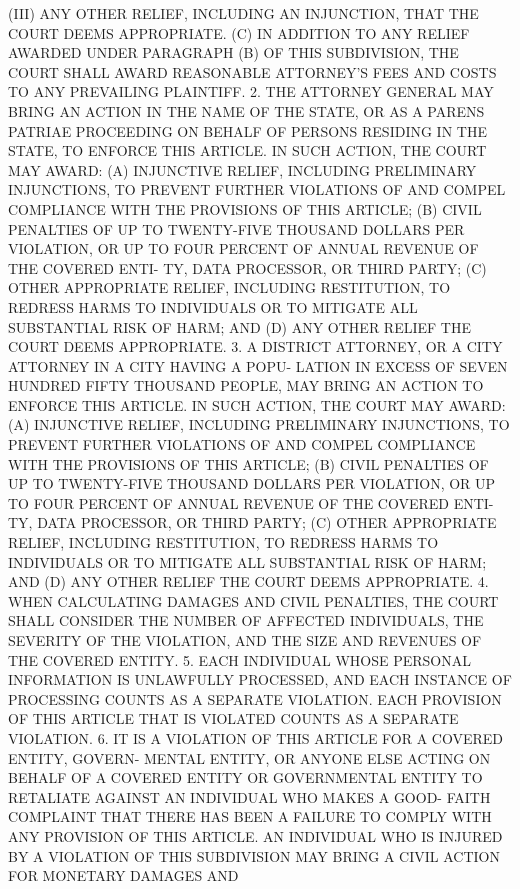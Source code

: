    (III) ANY OTHER RELIEF, INCLUDING AN INJUNCTION, THAT THE COURT  DEEMS
 APPROPRIATE.
   (C)  IN  ADDITION  TO  ANY  RELIEF AWARDED UNDER PARAGRAPH (B) OF THIS
 SUBDIVISION, THE COURT SHALL AWARD REASONABLE ATTORNEY'S FEES AND  COSTS
 TO ANY PREVAILING PLAINTIFF.
   2.  THE ATTORNEY GENERAL MAY BRING AN ACTION IN THE NAME OF THE STATE,
 OR AS A PARENS PATRIAE PROCEEDING ON BEHALF OF PERSONS RESIDING  IN  THE
 STATE, TO ENFORCE THIS ARTICLE. IN SUCH ACTION, THE COURT MAY AWARD:
   (A)  INJUNCTIVE  RELIEF, INCLUDING PRELIMINARY INJUNCTIONS, TO PREVENT
 FURTHER VIOLATIONS OF AND COMPEL COMPLIANCE WITH THE PROVISIONS OF  THIS
 ARTICLE;
   (B)  CIVIL  PENALTIES  OF  UP  TO  TWENTY-FIVE  THOUSAND  DOLLARS  PER
 VIOLATION, OR UP TO FOUR PERCENT OF ANNUAL REVENUE OF THE COVERED  ENTI-
 TY, DATA PROCESSOR, OR THIRD PARTY;
   (C)  OTHER APPROPRIATE RELIEF, INCLUDING RESTITUTION, TO REDRESS HARMS
 TO INDIVIDUALS OR TO MITIGATE ALL SUBSTANTIAL RISK OF HARM; AND
   (D) ANY OTHER RELIEF THE COURT DEEMS APPROPRIATE.
   3. A DISTRICT ATTORNEY, OR A CITY ATTORNEY IN A CITY  HAVING  A  POPU-
 LATION  IN  EXCESS  OF SEVEN HUNDRED FIFTY THOUSAND PEOPLE, MAY BRING AN
 ACTION TO ENFORCE THIS ARTICLE. IN SUCH ACTION, THE COURT MAY AWARD:
   (A) INJUNCTIVE RELIEF, INCLUDING PRELIMINARY INJUNCTIONS,  TO  PREVENT
 FURTHER  VIOLATIONS OF AND COMPEL COMPLIANCE WITH THE PROVISIONS OF THIS
 ARTICLE;
   (B)  CIVIL  PENALTIES  OF  UP  TO  TWENTY-FIVE  THOUSAND  DOLLARS  PER
 VIOLATION,  OR UP TO FOUR PERCENT OF ANNUAL REVENUE OF THE COVERED ENTI-
 TY, DATA PROCESSOR, OR THIRD PARTY;
   (C) OTHER APPROPRIATE RELIEF, INCLUDING RESTITUTION, TO REDRESS  HARMS
 TO INDIVIDUALS OR TO MITIGATE ALL SUBSTANTIAL RISK OF HARM; AND
   (D) ANY OTHER RELIEF THE COURT DEEMS APPROPRIATE.
   4.  WHEN  CALCULATING  DAMAGES  AND  CIVIL  PENALTIES, THE COURT SHALL
 CONSIDER THE  NUMBER  OF  AFFECTED  INDIVIDUALS,  THE  SEVERITY  OF  THE
 VIOLATION, AND THE SIZE AND REVENUES OF THE COVERED ENTITY.
   5. EACH INDIVIDUAL WHOSE PERSONAL INFORMATION IS UNLAWFULLY PROCESSED,
 AND  EACH  INSTANCE  OF  PROCESSING COUNTS AS A SEPARATE VIOLATION. EACH
 PROVISION OF  THIS  ARTICLE  THAT  IS  VIOLATED  COUNTS  AS  A  SEPARATE
 VIOLATION.
   6.  IT  IS  A  VIOLATION OF THIS ARTICLE FOR A COVERED ENTITY, GOVERN-
 MENTAL ENTITY, OR ANYONE ELSE ACTING ON BEHALF OF A  COVERED  ENTITY  OR
 GOVERNMENTAL ENTITY TO RETALIATE AGAINST AN INDIVIDUAL WHO MAKES A GOOD-
 FAITH  COMPLAINT  THAT  THERE  HAS  BEEN  A  FAILURE  TO COMPLY WITH ANY
 PROVISION OF THIS ARTICLE. AN INDIVIDUAL WHO IS INJURED BY  A  VIOLATION
 OF  THIS  SUBDIVISION  MAY BRING A CIVIL ACTION FOR MONETARY DAMAGES AND
